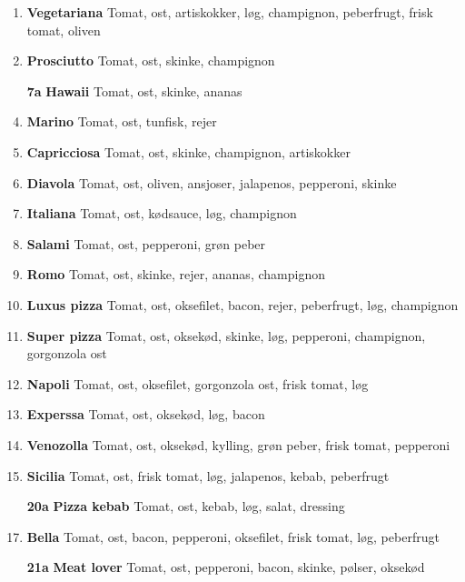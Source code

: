 \documentclass[danish,a4paper]{article}
\begin{document}
\begin{multicols}{2}
\begin{enumerate}[label={\large\textbf{\arabic*}.}]
    \item \textbf{\textcolor{vegigreen}{Vegetariana}} Tomat, ost, artiskokker, løg, champignon, peberfrugt, frisk tomat, oliven
    \item \textbf{Prosciutto} Tomat, ost, skinke, champignon 
    \item[\large\textbf{7a}] \textbf{Hawaii} Tomat, ost, skinke, ananas 
    \item \textbf{Marino} Tomat, ost, tunfisk, rejer
    \item \textbf{Capricciosa} Tomat, ost, skinke, champignon, artiskokker
    \item \textbf{Diavola} Tomat, ost, oliven, ansjoser, jalapenos, pepperoni, skinke
    \item \textbf{Italiana} Tomat, ost, kødsauce, løg, champignon 
    \item \textbf{Salami} Tomat, ost, pepperoni, grøn peber
    \item \textbf{Romo} Tomat, ost, skinke, rejer, ananas, champignon
    \item \textbf{Luxus pizza} Tomat, ost, oksefilet, bacon, rejer, peberfrugt, løg, champignon
    \item \textbf{Super pizza} Tomat, ost, oksekød, skinke, løg, pepperoni, champignon, gorgonzola ost
    \item \textbf{Napoli} Tomat, ost, oksefilet, gorgonzola ost, frisk tomat, løg
    \item \textbf{Experssa} Tomat, ost, oksekød, løg, bacon
    \setcounter{enumi}{18}
    \item \textbf{Venozolla} Tomat, ost, oksekød, kylling, grøn peber, frisk tomat, pepperoni
    \item \textbf{Sicilia} Tomat, ost, frisk tomat, løg, jalapenos, kebab, peberfrugt
    \item[\large\textbf{20a}] \textbf{Pizza kebab} Tomat, ost, kebab, løg, salat, dressing
    \item \textbf{Bella} Tomat, ost, bacon, pepperoni, oksefilet, frisk tomat, løg, peberfrugt
    \item[\large\textbf{21a}] \textbf{Meat lover} Tomat, ost, pepperoni, bacon, skinke, pølser, oksekød
\end{enumerate}

\end{multicols}
\end{document}
